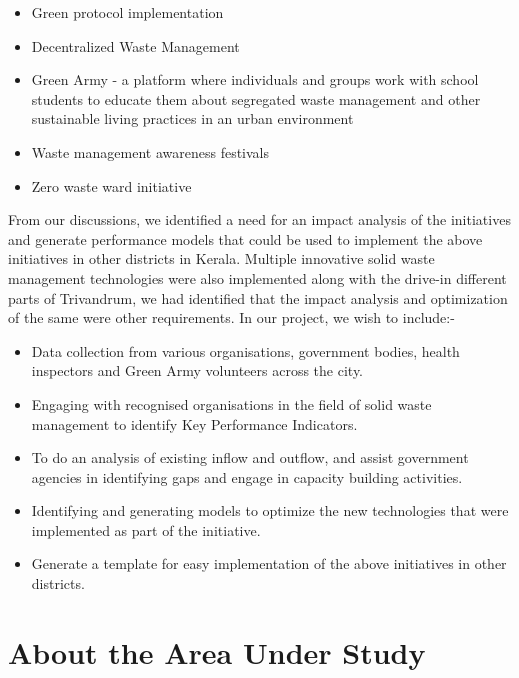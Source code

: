 \documentclass[12pt,a4paper]{  report}
\begin{document}
\vspace{5mm}

\begin{itemize}
\item Green protocol implementation
\item Decentralized Waste Management
\item Green Army - a platform where individuals and groups work with school students to educate them about  segregated waste management and other sustainable living practices in an urban environment
\item Waste management awareness festivals
\item Zero waste ward initiative
\end{itemize}

\vspace{5mm}

\begin{justify}
From our discussions, we identified a need for an impact analysis of the initiatives and generate performance models that could be used to implement the above initiatives in other districts in Kerala. Multiple innovative solid waste management technologies were also implemented along with the drive-in different parts of Trivandrum, we had identified that the impact analysis and optimization of the same were other requirements.
In our project, we wish to include:-
\end{justify}

\begin{itemize}
\item Data collection from various organisations, government bodies, health inspectors and Green Army volunteers across the city.
\item Engaging with recognised organisations in the field of solid waste management to identify Key Performance Indicators.
\item To do an analysis of existing inflow and outflow, and assist government agencies in identifying gaps and engage in capacity building activities.
\item Identifying and generating models to optimize the new technologies that were implemented as part of the initiative.
\item Generate a template for easy implementation of the above initiatives in other districts.
\end{itemize}



\chapter{\textbf{About the Area Under Study}}
\end{document}
